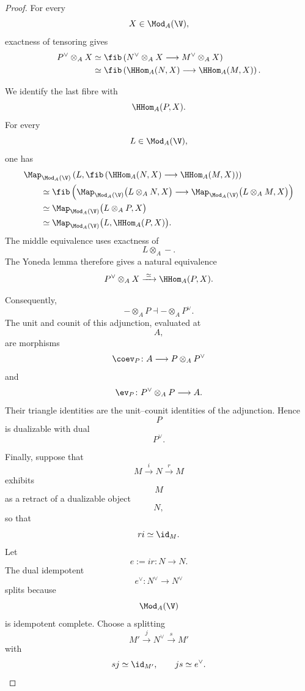 \begin{proof}
For every
\[
    X\in\Mod_A(\V),
\]
exactness of tensoring gives
\[
\begin{aligned}
    P^\vee\otimes_A X
    &\simeq
    \fib
    \left(
        N^\vee\otimes_A X
        \longrightarrow
        M^\vee\otimes_A X
    \right)
    \\
    &\simeq
    \fib
    \left(
        \HHom_A(N,X)
        \longrightarrow
        \HHom_A(M,X)
    \right).
\end{aligned}
\]

We identify the last fibre with
\[
    \HHom_A(P,X).
\]
For every
\[
    L\in\Mod_A(\V),
\]
one has
\[
\begin{aligned}
    &
    \Map_{\Mod_A(\V)}
    \left(
        L,
        \fib
        \left(
            \HHom_A(N,X)
            \longrightarrow
            \HHom_A(M,X)
        \right)
    \right)
    \\
    &\qquad\simeq
    \fib
    \left(
        \Map_{\Mod_A(\V)}
        \bigl(
            L\otimes_A N,
            X
        \bigr)
        \longrightarrow
        \Map_{\Mod_A(\V)}
        \bigl(
            L\otimes_A M,
            X
        \bigr)
    \right)
    \\
    &\qquad\simeq
    \Map_{\Mod_A(\V)}
    \bigl(
        L\otimes_A P,
        X
    \bigr)
    \\
    &\qquad\simeq
    \Map_{\Mod_A(\V)}
    \bigl(
        L,
        \HHom_A(P,X)
    \bigr).
\end{aligned}
\]
The middle equivalence uses exactness of
\[
    L\otimes_A-.
\]
The Yoneda lemma therefore gives a natural equivalence
\[
    P^\vee\otimes_A X
    \xrightarrow{\;\simeq\;}
    \HHom_A(P,X).
\]

Consequently,
\[
    -\otimes_A P
    \dashv
    -\otimes_A P^\vee.
\]
The unit and counit of this adjunction, evaluated at
\[
    A,
\]
are morphisms
\[
    \coev_P
    \colon
    A
    \longrightarrow
    P\otimes_A P^\vee
\]
and
\[
    \ev_P
    \colon
    P^\vee\otimes_A P
    \longrightarrow
    A.
\]
Their triangle identities are the unit--counit identities of the
adjunction. Hence
\[
    P
\]
is dualizable with dual
\[
    P^\vee.
\]

Finally, suppose that
\[
    M
    \xrightarrow{i}
    N
    \xrightarrow{r}
    M
\]
exhibits
\[
    M
\]
as a retract of a dualizable object
\[
    N,
\]
so that
\[
    r i
    \simeq
    \id_M.
\]
Let
\[
    e
    :=
    i r
    \colon
    N
    \longrightarrow
    N.
\]
The dual idempotent
\[
    e^\vee
    \colon
    N^\vee
    \longrightarrow
    N^\vee
\]
splits because
\[
    \Mod_A(\V)
\]
is idempotent complete. Choose a splitting
\[
    M'
    \xrightarrow{j}
    N^\vee
    \xrightarrow{s}
    M'
\]
with
\[
    s j
    \simeq
    \id_{M'},
    \qquad
    j s
    \simeq
    e^\vee.
\]


\end{proof}
